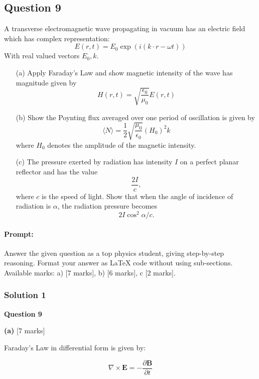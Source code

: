 \documentclass{article}
\begin{document}
\subsection{Question 9}
A transverse electromagnetic wave propagating in vacuum has an electric field which has complex representation:
\[
E(r, t) = E_0 \exp(i (k \cdot r - \omega t))
\]
With real valued vectors \(E_0, k\).

\begin{enumerate}
    \item[(a)] Apply Faraday’s Law and show magnetic intensity of the wave has magnitude given by
    \[
    H(r, t) = \sqrt{\frac{\epsilon_0}{\mu_0}} E(r, t)
    \]

    \item[(b)] Show the Poynting flux averaged over one period of oscillation is given by
    \[
    \langle N \rangle = \frac{1}{2} \sqrt{\frac{\mu_0}{\epsilon_0}} (H_0)^2 \hat{k}
    \]
    where \(H_0\) denotes the amplitude of the magnetic intensity.

    \item[(c)] The pressure exerted by radiation has intensity \(I\) on a perfect planar reflector and has the value
    \[
    \frac{2I}{c},
    \]
    where \(c\) is the speed of light. Show that when the angle of incidence of radiation is \(\alpha\), the radiation pressure becomes
    \[
    2I \cos^2 \alpha / c.
    \]
\end{enumerate}


\paragraph{Prompt: \\} 
Answer the given question as a top physics student, giving step-by-step reasoning. Format your answer as LaTeX code without using sub-sections. Available marks: a) [7 marks], b) [6 marks], c [2 marks].

\subsubsection{Solution 1}
\textbf{Question 9}

\textbf{(a)} [7 marks]

Faraday's Law in differential form is given by:

\begin{equation*}
\nabla \times \mathbf{E} = -\frac{\partial \mathbf{B}}{\partial t}
\end{equation*}
\end{document}
